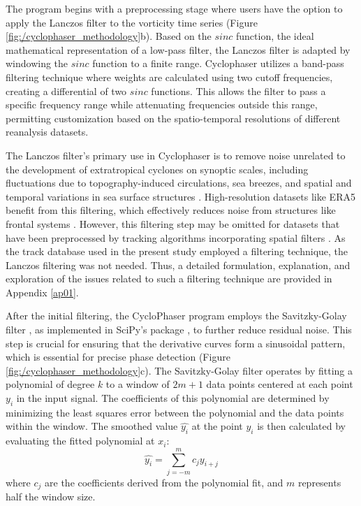 The program begins with a preprocessing stage where users have the option to apply the Lanczos filter \citep{duchon1979lanczos} to the vorticity time series (Figure \ref{fig:/cyclophaser_methodology}b). Based on the $sinc$ function, the ideal mathematical representation of a low-pass filter, the Lanczos filter is adapted by windowing the $sinc$ function to a finite range. Cyclophaser utilizes a band-pass filtering technique where weights are calculated using two cutoff frequencies, creating a differential of two $sinc$ functions. This allows the filter to pass a specific frequency range while attenuating frequencies outside this range, permitting customization based on the spatio-temporal resolutions of different reanalysis datasets.

The Lanczos filter's primary use in Cyclophaser is to remove noise unrelated to the development of extratropical cyclones on synoptic scales, including fluctuations due to topography-induced circulations, sea breezes, and spatial and temporal variations in sea surface structures \citep{steele2015modelling, da2017shallow, acevedo2010atmospheric}. High-resolution datasets like ERA5 benefit from this filtering, which effectively reduces noise from structures like frontal systems \citep{hoskins2002new}. However, this filtering step may be omitted for datasets that have been preprocessed by tracking algorithms incorporating spatial filters \citep[e.g.]{murray1991numerical, pinto2005sensitivities, flaounas2014cyclotrack, hoskins2002new}.  As the track database used in the present study employed a filtering technique, the Lanczos filtering was not needed. Thus, a detailed formulation, explanation, and exploration of the issues related to such a filtering technique are provided in Appendix \ref{ap01}.

After the initial filtering, the CycloPhaser program employs the Savitzky-Golay filter \citep{savitzky1964smoothing}, as implemented in SciPy's package \citep{virtanen2020scipy}, to further reduce residual noise. This step is crucial for ensuring that the derivative curves form a sinusoidal pattern, which is essential for precise phase detection (Figure \ref{fig:/cyclophaser_methodology}c). The Savitzky-Golay filter operates by fitting a polynomial of degree \( k \) to a window of \( 2m+1 \) data points centered at each point \( y_i \) in the input signal. The coefficients of this polynomial are determined by minimizing the least squares error between the polynomial and the data points within the window. The smoothed value \( \hat{y_i} \) at the point \( y_i \) is then calculated by evaluating the fitted polynomial at \( x_i \):
\[
\hat{y_i} = \sum_{j=-m}^{m} c_j y_{i+j}
\]
where \( c_j \) are the coefficients derived from the polynomial fit, and \( m \) represents half the window size.

